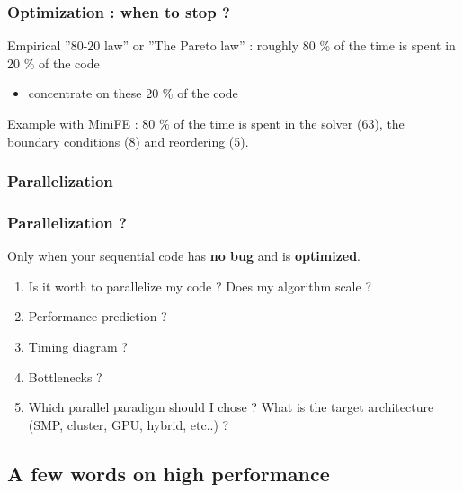 %
%

\begin{frame}
	\frametitle{Optimization : when to stop ?}

Empirical ''80-20 law'' or ''The Pareto law'' : roughly 80 \% of the time is spent in 20 \% of the code

	\begin{itemize}
	\item concentrate on these 20 \% of the code
	\end{itemize}

Example with MiniFE : 80 \% of the time is spent in the solver (63), the boundary conditions (8) and reordering (5).

\end{frame}



\subsubsection{Parallelization}

\begin{frame}
	\frametitle{Parallelization ?}

Only when your sequential code has {\bf no bug} and is {\bf optimized}.

	\begin{enumerate}
	\item Is it worth to parallelize my code ? Does my algorithm scale ?
	\item Performance prediction ?
	\item Timing diagram ?
	\item Bottlenecks ? 
	\item Which parallel paradigm should I chose ? What is the target architecture (SMP, cluster, GPU, hybrid, etc..) ? 
	\end{enumerate}
\end{frame}




\subsection{A few words on high performance}


